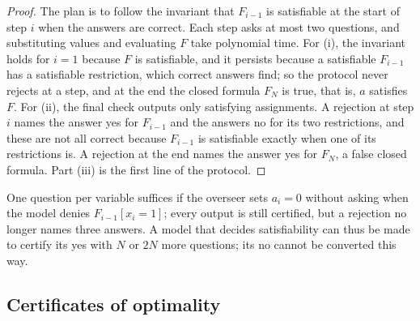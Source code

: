 \begin{refsection}

\begin{proof}
The plan is to follow the invariant that $F_{i-1}$ is satisfiable at the start of step $i$ when the answers are correct. Each step asks at most two questions, and substituting values and evaluating $F$ take polynomial time. For (i), the invariant holds for $i=1$ because $F$ is satisfiable, and it persists because a satisfiable $F_{i-1}$ has a satisfiable restriction, which correct answers find; so the protocol never rejects at a step, and at the end the closed formula $F_N$ is true, that is, $a$ satisfies $F$. For (ii), the final check outputs only satisfying assignments. A rejection at step $i$ names the answer yes for $F_{i-1}$ and the answers no for its two restrictions, and these are not all correct because $F_{i-1}$ is satisfiable exactly when one of its restrictions is. A rejection at the end names the answer yes for $F_N$, a false closed formula. Part (iii) is the first line of the protocol.
\end{proof}

One question per variable suffices if the overseer sets $a_i=0$ without asking when the model denies $F_{i-1}[x_i{=}1]$; every output is still certified, but a rejection no longer names three answers. A model that decides satisfiability can thus be made to certify its yes with $N$ or $2N$ more questions; its no cannot be converted this way.

\subsection{Certificates of optimality}


\end{refsection}
